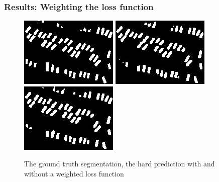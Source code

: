 \documentclass[aspectratio=1610]{beamer}
\begin{document}
\begin{frame}
  \frametitle{\hfill Results: Weighting the loss function}
\begin{figure}[H]
  \includegraphics[width=\linewidth]{class_vs_w/label_2}
\endminipage\hfill
{}
  \includegraphics[width=\linewidth]{class_vs_w/un_weight_2}
\endminipage\hfill
{}%
  \includegraphics[width=\linewidth]{class_vs_w/weight_2}
\endminipage
\caption{The ground truth segmentation, the hard prediction with and without a weighted loss function}
\end{figure}
\end{frame}
\end{document}
